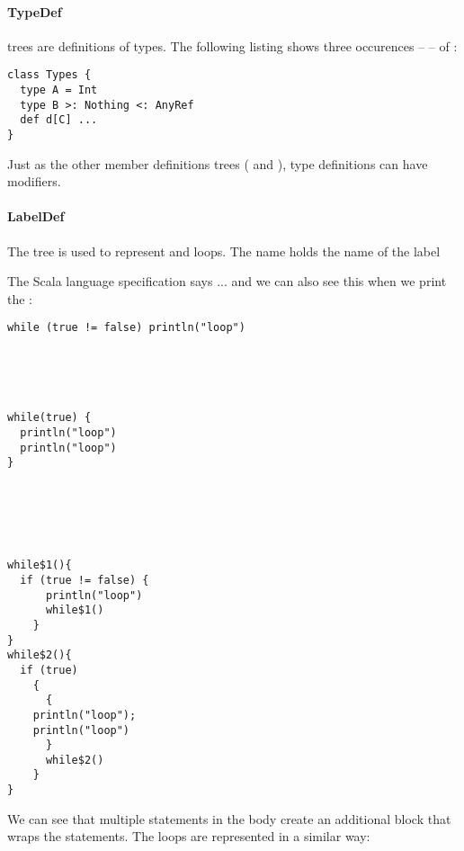 \paragraph{TypeDef} 

\noindent {} trees are definitions of types. The following listing shows three occurences --  -- of :

\begin{lstlisting}
class Types {
  type A = Int
  type B >: Nothing <: AnyRef
  def d[C] ...
}
\end{lstlisting}

Just as the other member definitions trees ( and ), type definitions can have modifiers.

\paragraph{LabelDef} 

\noindent The  tree is used to represent  and  loops. The name holds the name of the label

The Scala language specification says ... and we can also see this when we print the :

\begin{multicols}{2}
\begin{lstlisting}
while (true != false) println("loop")





while(true) {
  println("loop")
  println("loop")
}






\end{lstlisting}
\begin{lstlisting}
while$1(){
  if (true != false) {
      println("loop")
      while$1()
    }
}
while$2(){
  if (true)
    {
      {
	println("loop");
	println("loop")
      }
      while$2()
    }
}
\end{lstlisting}
\end{multicols}

We can see that multiple statements in the body create an additional block that wraps the statements. The  loops are represented in a similar way:

